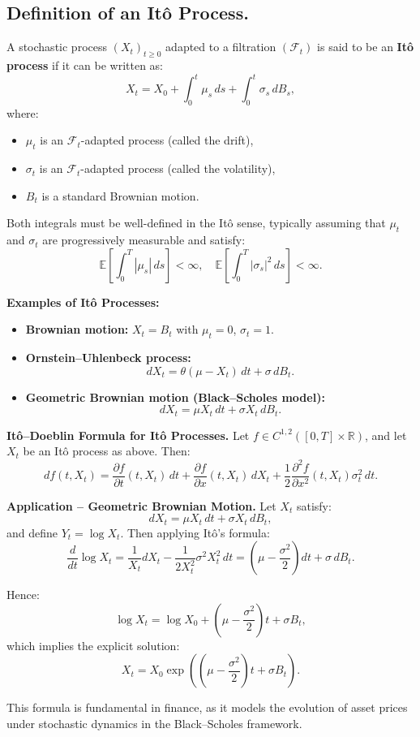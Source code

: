 
\subsection{Definition of an Itô Process.}  
A stochastic process \( (X_t)_{t \geq 0} \) adapted to a filtration \( (\mathcal{F}_t) \) is said to be an \textbf{Itô process} if it can be written as:
\[
X_t = X_0 + \int_0^t \mu_s \, ds + \int_0^t \sigma_s \, dB_s,
\]
where:
\begin{itemize}
    \item \( \mu_t \) is an \( \mathcal{F}_t \)-adapted process (called the drift),
    \item \( \sigma_t \) is an \( \mathcal{F}_t \)-adapted process (called the volatility),
    \item \( B_t \) is a standard Brownian motion.
\end{itemize}
Both integrals must be well-defined in the Itô sense, typically assuming that \( \mu_t \) and \( \sigma_t \) are progressively measurable and satisfy:
\[
\mathbb{E} \left[ \int_0^T |\mu_s| \, ds \right] < \infty, \quad 
\mathbb{E} \left[ \int_0^T |\sigma_s|^2 \, ds \right] < \infty.
\]

\textbf{Examples of Itô Processes:}
\begin{itemize}
    \item \textbf{Brownian motion:} \( X_t = B_t \) with \( \mu_t = 0 \), \( \sigma_t = 1 \).
    \item \textbf{Ornstein–Uhlenbeck process:}  
    \[
    dX_t = \theta(\mu - X_t) \, dt + \sigma \, dB_t.
    \]
    \item \textbf{Geometric Brownian motion (Black–Scholes model):}  
    \[
    dX_t = \mu X_t \, dt + \sigma X_t \, dB_t.
    \]
\end{itemize}

\textbf{Itô–Doeblin Formula for Itô Processes.}  
Let \( f \in C^{1,2}([0,T] \times \mathbb{R}) \), and let \( X_t \) be an Itô process as above. Then:
\[
df(t, X_t) = \frac{\partial f}{\partial t}(t, X_t) \, dt + \frac{\partial f}{\partial x}(t, X_t) \, dX_t + \frac{1}{2} \frac{\partial^2 f}{\partial x^2}(t, X_t) \sigma_t^2 \, dt.
\]

\textbf{Application – Geometric Brownian Motion.}  
Let \( X_t \) satisfy:
\[
dX_t = \mu X_t \, dt + \sigma X_t \, dB_t,
\]
and define \( Y_t = \log X_t \). Then applying Itô’s formula:
\[
\frac{d}{dt} \log X_t = \frac{1}{X_t} dX_t - \frac{1}{2 X_t^2} \sigma^2 X_t^2 \, dt = \left( \mu - \frac{\sigma^2}{2} \right) dt + \sigma \, dB_t.
\]

Hence:
\[
\log X_t = \log X_0 + \left( \mu - \frac{\sigma^2}{2} \right)t + \sigma B_t,
\]
which implies the explicit solution:
\[
X_t = X_0 \exp \left( \left( \mu - \frac{\sigma^2}{2} \right)t + \sigma B_t \right).
\]

This formula is fundamental in finance, as it models the evolution of asset prices under stochastic dynamics in the Black–Scholes framework.